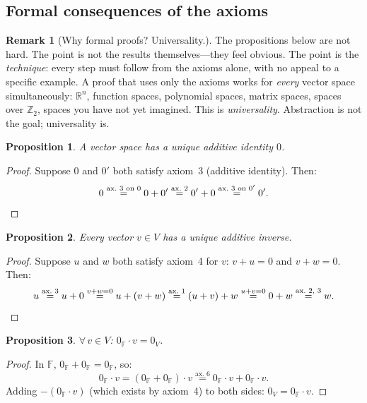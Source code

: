 \documentclass[11pt]{article}
\theoremstyle{definition}
\newtheorem{remark}{Remark}[section]
\theoremstyle{plain}
\newtheorem{proposition}{Proposition}[section]
\begin{document}
\subsection{Formal consequences of the axioms}

\begin{remark}[Why formal proofs?  Universality.]
  The propositions below are not hard.  The point is not the results
  themselves---they feel obvious.  The point is the \emph{technique}:
  every step must follow from the axioms alone, with no appeal to a
  specific example.  A proof that uses only the axioms works for
  \emph{every} vector space simultaneously: $\mathbb{R}^n$, function
  spaces, polynomial spaces, matrix spaces, spaces over $\mathbb{Z}_2$,
  spaces you have not yet imagined.  This is \emph{universality}.
  Abstraction is not the goal; universality is.
\end{remark}

\begin{proposition}
  A vector space has a unique additive identity $0$.
\end{proposition}
\begin{proof}
  Suppose $0$ and $0'$ both satisfy axiom~3 (additive identity).  Then:
  \[
    0
    \stackrel{\text{ax.~3 on }0}{=} 0 + 0'
    \stackrel{\text{ax.~2}}{=} 0' + 0
    \stackrel{\text{ax.~3 on }0'}{=} 0'. \qedhere
  \]
\end{proof}

\begin{proposition}
  Every vector $v\in V$ has a unique additive inverse.
\end{proposition}
\begin{proof}
  Suppose $u$ and $w$ both satisfy axiom~4 for $v$: $v+u=0$ and $v+w=0$.
  Then:
  \[
    u
    \stackrel{\text{ax.~3}}{=} u + 0
    \stackrel{v+w=0}{=} u + (v + w)
    \stackrel{\text{ax.~1}}{=} (u + v) + w
    \stackrel{u+v=0}{=} 0 + w
    \stackrel{\text{ax.~2,~3}}{=} w. \qedhere
  \]
\end{proof}

\begin{proposition}
  $\forall\, v\in V$:\; $0_{\mathbb{F}}\cdot v = 0_V$.
\end{proposition}
\begin{proof}
  In $\mathbb{F}$, $0_{\mathbb{F}} + 0_{\mathbb{F}} = 0_{\mathbb{F}}$, so:
  \[
    0_{\mathbb{F}}\cdot v
    = (0_{\mathbb{F}} + 0_{\mathbb{F}})\cdot v
    \stackrel{\text{ax.~6}}{=} 0_{\mathbb{F}}\cdot v + 0_{\mathbb{F}}\cdot v.
  \]
  Adding $-(0_{\mathbb{F}}\cdot v)$ (which exists by axiom~4) to both sides:
  $0_V = 0_{\mathbb{F}}\cdot v$.
\end{proof}
\end{document}
